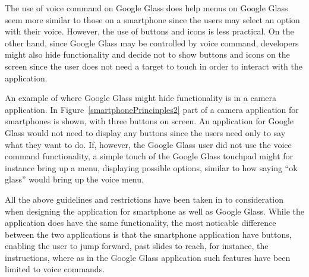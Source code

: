 The use of voice command on Google Glass does help menus on Google Glass seem more similar to those on a smartphone since the users may select an option with their voice. However, the use of buttons and icons is less practical. On the other hand, since Google Glass may be controlled by voice command, developers might also hide functionality and decide not to show buttons and icons on the screen since the user does not need a target to touch in order to interact with the application.

An example of where Google Glass might hide functionality is in a camera application. In Figure~\ref{smartphonePrincinples2} part of a camera application for smartphones is shown, with three buttons on screen. An application for Google Glass would not need to display any buttons since the users need only to say what they want to do. If, however, the Google Glass user did not use the voice command functionality, a simple touch of the Google Glass touchpad might for instance bring up a menu, displaying possible options, similar to how saying ``ok glass'' would bring up the voice menu.

All the above guidelines and restrictions have been taken in to consideration when designing the application for smartphone as well as Google Glass. While the application does have the same functionality, the most noticable difference between the two applications is that the smartphone application have buttons, enabling the user to jump forward, past slides to reach, for instance, the instructions, where as in the Google Glass application such features have been limited to voice commands.